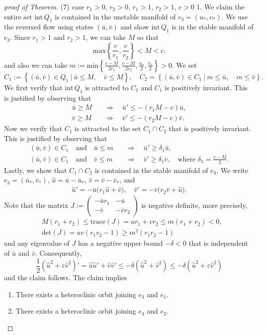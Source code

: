 \documentclass{amsart}
\theoremstyle{definition}
\numberwithin{equation}{section}
\def\ii{{\textrm{int}}\,}
\begin{document}
\begin{proof}[proof of Theorem]
(7) case  $r_1>0$, $r_2>0$, $r_1>1$, $r_2>1$, $c>0$
1. We claim the entire set $\ii Q_1$ is contained in the unstable manifold of $e_3=(u_*,v_*)$. We use the reversed flow using states $(\bar u, \bar v)$  and show $\ii Q_1$ is in the stable manifold of $e_3$. Since $r_1>1$ and $r_2>1$, we can take $M$ so that
$$ \textrm{max}\left\{ \frac{c}{r_1}, \frac{c}{r_2}\right\} < M < c.$$
and also we can take $m:=\textrm{min}\left\{ \frac{c-M}{2r_1}, \frac{c-M}{2r_2}, \frac{u_*}{2}, \frac{v_*}{2} \right\}>0$.
We set $$C_1:= \left\{(\bar u,\bar v) \in Q_1~|~ \bar u \le M, \quad \bar v \le M\right\}, \quad C_2= \left\{(\bar u,\bar v) \in C_1 ~|~ m \le \bar u, \quad m\le \bar v \right\}.$$
We first verify that $\ii Q_1$ is attracted to $C_1$ and $C_1$ is positively invariant. This is justified by observing that
\begin{align*}
 \bar u \ge M  \quad &\Longrightarrow \quad \bar u' \le -(r_1M-c) \bar u, \\
 \bar v \ge M  \quad &\Longrightarrow \quad \bar v' \le -(r_2M-c) \bar v.
\end{align*}
Now we verify that $C_1$ is attracted to the set $C_1 \cap C_2$ that is positively invariant. This is justified by observing that
\begin{align*}
 (\bar u,\bar v)\in C_1 \quad \text{and} \quad \bar u \le m \quad &\Longrightarrow \quad \bar u' \ge \delta_1 \bar u, \\
 (\bar u,\bar v)\in C_1 \quad \text{and} \quad \bar v \le m \quad &\Longrightarrow \quad \bar v'\ge \delta_1 \bar v, \quad \text{where $\delta_1 = \frac{c-M}{2}$}.
\end{align*}
Lastly, we show that $C_1\cap C_2$ is contained in the stable manifold of $e_3$. We write $e_3 = (\bar u_*, \bar v_*)$, $\hat u = \bar u - \bar u_*$, $\hat v = \bar v - \bar v_*$, and 
\begin{align*}
 \hat u' = -\bar u \big(r_1 \hat u + \hat v\big), \quad 
 \hat v' = -\bar v \big(r_2 \hat v + \hat u\big).
\end{align*}
Note that the matrix $J:=\begin{pmatrix} -\bar ur_1 & -\bar u \\ -\bar v & -\bar vr_2 \end{pmatrix}$ is negative definite, more precisely,
\begin{align*}
&M(r_1+r_2) \le \textrm{trace}(J) = ur_1 + vr_2 \le m(r_1+ r_2) < 0, \\
&\textrm{det}(J) = uv(r_1r_2-1) \ge m^2(r_1r_2-1) 
\end{align*}
and any eigenvalue of $J$ has a negative upper bound $-\delta<0$ that is independent of $\bar u$ and $\bar v$. Consequently, 
$$ \frac{1}{2} (\hat{u}^2 + \varepsilon\hat{v}^2)' = \hat u \hat u' + \hat v \hat v' \le -\delta (\hat{u}^2 + \hat{v}^2)\le -\delta (\hat{u}^2 + \varepsilon\hat{v}^2)$$
and the claim follows. The claim implies
\begin{enumerate}
 \item There exists a heteroclinic orbit joining $e_3$ and $e_1$.
 \item There exists a heteroclinic orbit joining $e_3$ and $e_2$.
\end{enumerate}


\end{proof}
\end{document}
